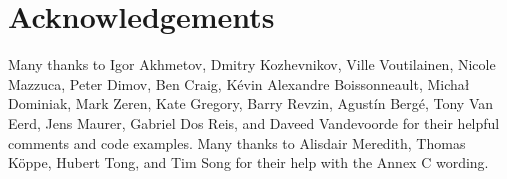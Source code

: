 
\section*{Acknowledgements}

Many thanks to Igor Akhmetov, Dmitry Kozhevnikov, Ville Voutilainen, Nicole Mazzuca, Peter Dimov, Ben Craig, K\' evin Alexandre Boissonneault, Micha{\l} Dominiak, Mark Zeren, Kate Gregory, Barry Revzin, Agust\' in Berg\' e, Tony Van Eerd, Jens Maurer, Gabriel Dos Reis, and Daveed Vandevoorde for their helpful comments and code examples. Many thanks to Alisdair Meredith, Thomas K\"oppe, Hubert Tong, and Tim Song for their help with the Annex C wording.


\renewcommand{\bibname}{References}



